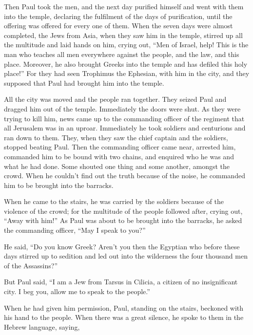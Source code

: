  Then Paul took the men, and the next day purified himself
and went with them into the temple, declaring the fulfilment of the days
of purification, until the offering was offered for every one of them.
 When the seven days were almost completed, the Jews from
Asia, when they saw him in the temple, stirred up all the multitude and
laid hands on him,  crying out, ``Men of Israel, help! This
is the man who teaches all men everywhere against the people, and the
law, and this place. Moreover, he also brought Greeks into the temple
and has defiled this holy place!''  For they had seen
Trophimus the Ephesian, with him in the city, and they supposed that
Paul had brought him into the temple.

 All the city was moved and the people ran together. They
seized Paul and dragged him out of the temple. Immediately the doors
were shut.  As they were trying to kill him, news came up
to the commanding officer of the regiment that all Jerusalem was in an
uproar.  Immediately he took soldiers and centurions and
ran down to them. They, when they saw the chief captain and the
soldiers, stopped beating Paul.  Then the commanding
officer came near, arrested him, commanded him to be bound with two
chains, and enquired who he was and what he had done.  Some
shouted one thing and some another, amongst the crowd. When he couldn't
find out the truth because of the noise, he commanded him to be brought
into the barracks.

 When he came to the stairs, he was carried by the soldiers
because of the violence of the crowd;  for the multitude of
the people followed after, crying out, ``Away with him!'' 
As Paul was about to be brought into the barracks, he asked the
commanding officer, ``May I speak to you?''

He said, ``Do you know Greek?  Aren't you then the Egyptian
who before these days stirred up to sedition and led out into the
wilderness the four thousand men of the Assassins?''

 But Paul said, ``I am a Jew from Tarsus in Cilicia, a
citizen of no insignificant city. I beg you, allow me to speak to the
people.''

 When he had given him permission, Paul, standing on the
stairs, beckoned with his hand to the people. When there was a great
silence, he spoke to them in the Hebrew language, saying,

